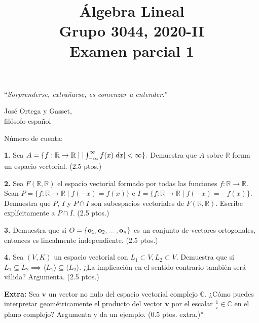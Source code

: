 \documentclass[a4paper]{article}
\begin{document}
\title{Álgebra Lineal \\ Grupo 3044, 2020-II \\ Examen parcial 1}
\date{}
\maketitle

\epigraph{``\textit{Sorprenderse, extrañarse, es comenzar a entender.}''}{\textemdash José Ortega y Gasset, \\ filósofo español}

Número de cuenta:

\vspace{5mm}
\textbf{1.} Sea $A=\{f:\mathbb{R}\to\mathbb{R}\mid |\int_{-\infty}^{\infty} f(x)\hspace{1mm} dx| < \infty \}.$ Demuestra que $A$ sobre $\mathbb{R}$ forma un espacio vectorial. (2.5 ptos.)

\vspace{5mm}
\textbf{2.} Sea $F(\mathbb{R},\mathbb{R})$ el espacio vectorial formado por todas las funciones $f:\mathbb{R}\to \mathbb{R}$. Sean $P=\{f:\mathbb{R}\to \mathbb{R}\mid f(-x) = f(x)\}$ e $I=\{f:\mathbb{R}\to \mathbb{R}\mid f(-x)=-f(x)\}$. Demuestra que $P$, $I$ y $P\cap I$ son subespacios vectoriales de $F(\mathbb{R},\mathbb{R})$. Escribe explícitamente a $P\cap I$. (2.5 ptos.)

\vspace{5mm}
\textbf{3.} Demuestra que si $O=\{\mathbf{o}_1,\mathbf{o}_2,...\hspace{1mm} , \mathbf{o}_n\}$ es un conjunto de vectores ortogonales, entonces es linealmente independiente. (2.5 ptos.)

\vspace{5mm}
\textbf{4.} Sea $(V,K)$ un espacio vectorial con $L_1\subset V, L_2\subset V$. Demuestra que si $L_1\subseteq L_2\implies\langle L_1 \rangle \subseteq \langle L_2 \rangle.$ ¿La implicación en el sentido contrario también será válida? Argumenta. (2.5 ptos.)

\vspace{5mm}
\textbf{Extra:} Sea $\mathbf{v}$ un vector no nulo del espacio vectorial complejo $\mathbb{C}$. ¿Cómo puedes interpretar geométricamente el producto del vector $\mathbf{v}$ por el escalar $\frac{1}{i}\in\mathbb{C}$ en el plano complejo? Argumenta y da un ejemplo. (0.5 ptos. extra.)*
\end{document}
